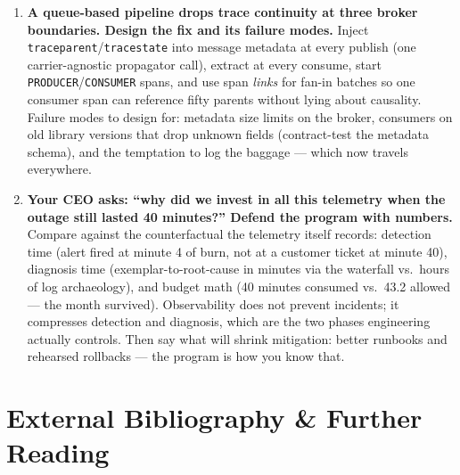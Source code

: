 \begin{enumerate}[label=\textbf{Q\arabic*.}, leftmargin=1.6cm, start=31]
        which \emph{over-represents} errors and slow traces --- your SLI
        would read worse than reality, or better under head sampling if
        errors correlate with sampling bugs). Second, SLOs must be computed
        from complete event data: unsampled request logs, load-balancer
        records, or pre-sampling metric aggregations. Traces are for
        diagnosis; SLIs are for accounting; never mix the supplies.
  \item \textbf{A queue-based pipeline drops trace continuity at three
        broker boundaries. Design the fix and its failure modes.}
        Inject \texttt{traceparent}/\texttt{tracestate} into message
        metadata at every publish (one carrier-agnostic propagator call),
        extract at every consume, start \texttt{PRODUCER}/\texttt{CONSUMER}
        spans, and use span \emph{links} for fan-in batches so one
        consumer span can reference fifty parents without lying about
        causality. Failure modes to design for: metadata size limits on the
        broker, consumers on old library versions that drop unknown fields
        (contract-test the metadata schema), and the temptation to log the
        baggage --- which now travels everywhere.
  \item \textbf{Your CEO asks: ``why did we invest in all this telemetry
        when the outage still lasted 40 minutes?'' Defend the program with
        numbers.}
        Compare against the counterfactual the telemetry itself records:
        detection time (alert fired at minute 4 of burn, not at a customer
        ticket at minute 40), diagnosis time (exemplar-to-root-cause in
        minutes via the waterfall vs.\ hours of log archaeology), and
        budget math (40 minutes consumed vs.\ 43.2 allowed --- the
        month survived). Observability does not prevent incidents; it
        compresses detection and diagnosis, which are the two phases
        engineering actually controls. Then say what will shrink
        mitigation: better runbooks and rehearsed rollbacks --- the program
        is how you know that.
\end{enumerate}
\section{External Bibliography \& Further Reading}
\label{sec:ch18-bibliography}

